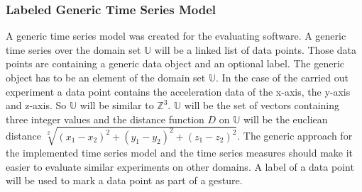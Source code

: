 \subsubsection{Labeled Generic Time Series Model} \label{labeled_generic_time_series_model}
A generic time series model was created for the evaluating software. A generic time series over the domain set
$\mathbb{U}$ will be a linked list of data points. Those data points are containing a generic data object and an
optional label. The generic object has to be an element of the domain set $\mathbb{U}$. In the case of the carried out
experiment a data point contains the acceleration data of the x-axis, the y-axis and z-axis. So $\mathbb{U}$ will be
similar to $\mathbb{Z}^3$. $\mathbb{U}$ will be the set of vectors containing three integer values and the distance
function $D$ on $\mathbb{U}$ will be the eucliean distance $\sqrt[2]{(x_1 - x_2)^2 + (y_1 - y_2)^2 + (z_1 - z_2)^2}$.
The generic approach for the implemented time series model and the time series measures should make it easier to
evaluate similar experiments on other domains. A label of a data point will be used to mark a data point as part of a
gesture.
